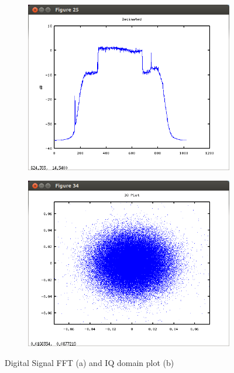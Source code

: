 \begin{figure}
\centering
\begin{subfigure}{.49\textwidth}
\centering
\includegraphics[width=\linewidth]{../img/Report_Decimated_Digital_Signal.png}
\caption{ }
\end{subfigure}
\begin{subfigure}{.49\textwidth}
\centering
\includegraphics[width=\linewidth]{../img/Report_IQ_Plot_Digital.png}
\caption{ }
\end{subfigure}
\caption{Digital Signal FFT (a) and IQ domain plot (b)}
\label{fig:digitalIQ}
\end{figure}

